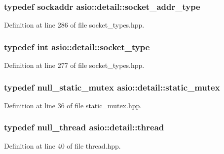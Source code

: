 \subsubsection[{socket\+\_\+addr\+\_\+type}]{\setlength{\rightskip}{0pt plus 5cm}typedef sockaddr {\bf asio\+::detail\+::socket\+\_\+addr\+\_\+type}}\label{namespaceasio_1_1detail_a40a7b0385a38f87815ffbb8df5e34d05}


Definition at line 286 of file socket\+\_\+types.\+hpp.

\hypertarget{namespaceasio_1_1detail_a6798c771dd84b79798b1a08150706ea9}{}
\subsubsection[{socket\+\_\+type}]{\setlength{\rightskip}{0pt plus 5cm}typedef int {\bf asio\+::detail\+::socket\+\_\+type}}\label{namespaceasio_1_1detail_a6798c771dd84b79798b1a08150706ea9}


Definition at line 277 of file socket\+\_\+types.\+hpp.

\hypertarget{namespaceasio_1_1detail_a7c96c5c11c31acb79c355cdbcf4d069a}{}
\subsubsection[{static\+\_\+mutex}]{\setlength{\rightskip}{0pt plus 5cm}typedef {\bf null\+\_\+static\+\_\+mutex} {\bf asio\+::detail\+::static\+\_\+mutex}}\label{namespaceasio_1_1detail_a7c96c5c11c31acb79c355cdbcf4d069a}


Definition at line 36 of file static\+\_\+mutex.\+hpp.

\hypertarget{namespaceasio_1_1detail_adaf42fbdc0c550e0a926a0395898572a}{}
\subsubsection[{thread}]{\setlength{\rightskip}{0pt plus 5cm}typedef {\bf null\+\_\+thread} {\bf asio\+::detail\+::thread}}\label{namespaceasio_1_1detail_adaf42fbdc0c550e0a926a0395898572a}


Definition at line 40 of file thread.\+hpp.

